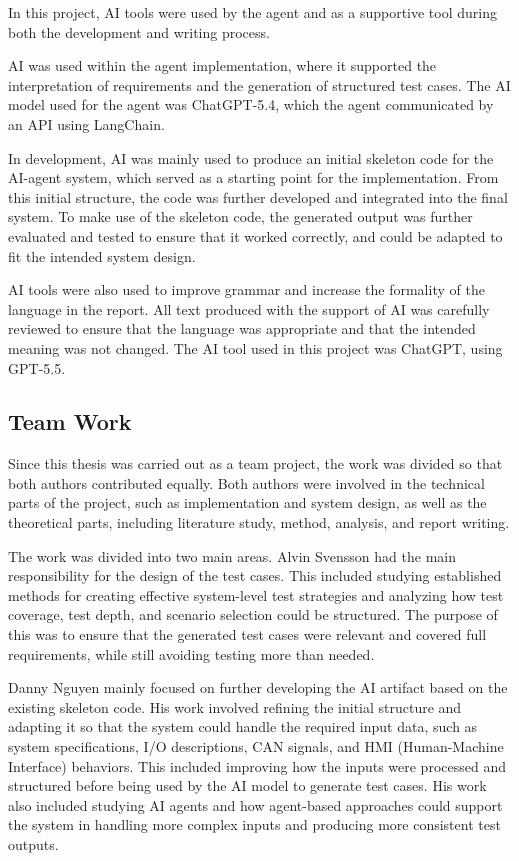 \documentclass[a4paper,12pt]{article}
\begin{document}
In this project, AI tools were used by the agent and as a supportive tool during both the development and writing process.

AI was used within the agent implementation, where it supported the interpretation of requirements and the generation of structured test cases. The AI model used for the agent was ChatGPT-5.4, which the agent communicated by an API using LangChain.


In development, AI was mainly used to produce an initial skeleton code for the AI-agent system, which served as a starting point for the implementation. From this initial structure, the code was further developed and integrated into the final system. To make use of the skeleton code, the generated output was further evaluated and tested to ensure that it worked correctly, and could be adapted to fit the intended system design.

AI tools were also used to improve grammar and increase the formality of the language in the report. All text produced with the support of AI was carefully reviewed to ensure that the language was appropriate and that the intended meaning was not changed. The AI tool used in this project was ChatGPT, using GPT-5.5.

\subsection{Team Work}
Since this thesis was carried out as a team project, the work was divided so that both authors contributed equally. Both authors were involved in the technical parts of the project, such as implementation and system design, as well as the theoretical parts, including literature study, method, analysis, and report writing.

The work was divided into two main areas. Alvin Svensson had the main responsibility for the design of the test cases. This included studying established methods for creating effective system-level test strategies and analyzing how test coverage, test depth, and scenario selection could be structured. The purpose of this was to ensure that the generated test cases were relevant and covered full requirements, while still avoiding testing more than needed.

Danny Nguyen mainly focused on further developing the AI artifact based on the existing skeleton code. His work involved refining the initial structure and adapting it so that the system could handle the required input data, such as system specifications, I/O descriptions, CAN signals, and HMI (Human-Machine Interface) behaviors. This included improving how the inputs were processed and structured before being used by the AI model to generate test cases. His work also included studying AI agents and how agent-based approaches could support the system in handling more complex inputs and producing more consistent test outputs.
\end{document}
